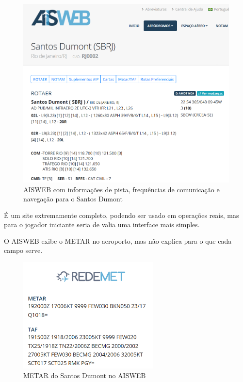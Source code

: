 \begin{figure}[ht]
    \begin{center}
    \includegraphics[width=400pt]{img/aisweb.png}
    \caption{AISWEB com informações de pista, frequências de comunicação e navegação para o Santos Dumont}
    \label{fig:aisweb}
    \end{center}
\end{figure}

É um site extremamente completo, podendo
ser usado em operações reais, mas para o jogador iniciante seria 
de valia uma interface mais simples.

O AISWEB exibe o METAR no aeroporto, mas não explica para o que cada campo serve.

\begin{figure}[ht]
    \begin{center}
    \includegraphics[width=200pt]{img/metar-aisweb.png}
    \caption{METAR do Santos Dumont no AISWEB}
    \label{fig:aisweb}
    \end{center}
\end{figure}

